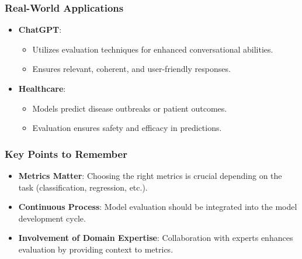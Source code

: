 \documentclass[aspectratio=169]{beamer}
\begin{document}
\begin{frame}[fragile]
    \frametitle{Real-World Applications}

    \begin{itemize}
        \item \textbf{ChatGPT}:
            \begin{itemize}
                \item Utilizes evaluation techniques for enhanced conversational abilities.
                \item Ensures relevant, coherent, and user-friendly responses.
            \end{itemize}
        
        \item \textbf{Healthcare}:
            \begin{itemize}
                \item Models predict disease outbreaks or patient outcomes.
                \item Evaluation ensures safety and efficacy in predictions.
            \end{itemize}
    \end{itemize}
    
\end{frame}

\begin{frame}[fragile]
    \frametitle{Key Points to Remember}
    
    \begin{itemize}
        \item \textbf{Metrics Matter}: Choosing the right metrics is crucial depending on the task (classification, regression, etc.).
        \item \textbf{Continuous Process}: Model evaluation should be integrated into the model development cycle.
        \item \textbf{Involvement of Domain Expertise}: Collaboration with experts enhances evaluation by providing context to metrics.
    \end{itemize}
    
\end{frame}
\end{document}
